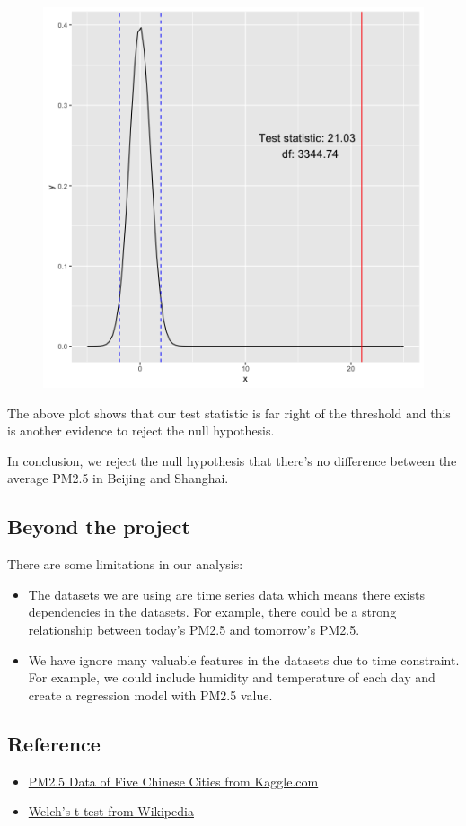 \documentclass[]{article}
\begin{document}
\begin{figure}
\centering
\includegraphics{../results/testplot.png}
\caption{}
\end{figure}

The above plot shows that our test statistic is far right of the
threshold and this is another evidence to reject the null hypothesis.

In conclusion, we reject the null hypothesis that there's no difference
between the average PM2.5 in Beijing and Shanghai.

\subsection{Beyond the project}\label{beyond-the-project}

There are some limitations in our analysis:

\begin{itemize}
\item
  The datasets we are using are time series data which means there
  exists dependencies in the datasets. For example, there could be a
  strong relationship between today's PM2.5 and tomorrow's PM2.5.
\item
  We have ignore many valuable features in the datasets due to time
  constraint. For example, we could include humidity and temperature of
  each day and create a regression model with PM2.5 value.
\end{itemize}

\subsection{Reference}\label{reference}

\begin{itemize}
\item
  \href{https://www.kaggle.com/uciml/pm25-data-for-five-chinese-cities}{PM2.5
  Data of Five Chinese Cities from Kaggle.com}
\item
  \href{https://en.wikipedia.org/wiki/Welch\%27s_t-test}{Welch's t-test
  from Wikipedia}
\end{itemize}
\end{document}
